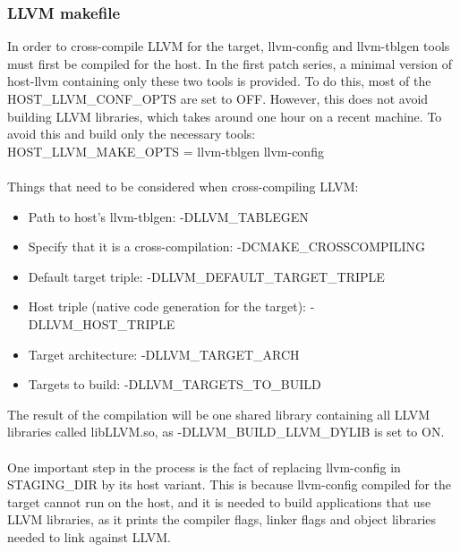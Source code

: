 \documentclass[12pt,a4paper,oneside]{article}
\begin{document}
\subsubsection*{LLVM makefile}
In order to cross-compile LLVM for the target, llvm-config and llvm-tblgen tools
must first be compiled for the host. In the first patch series, a minimal version of
host-llvm containing only these two tools is provided. To do this, most of the
{\selectfont HOST\_LLVM\_CONF\_OPTS} are set to OFF. However,
this does not avoid building LLVM libraries, which takes around one hour on a
recent machine. To avoid this and build only the necessary tools:\\
{\selectfont HOST\_LLVM\_MAKE\_OPTS = llvm-tblgen llvm-config}\\\\
Things that need to be considered when cross-compiling LLVM:
\begin{itemize}
  \item Path to host's llvm-tblgen: {\selectfont
  -DLLVM\_TABLEGEN}
  \item Specify that it is a cross-compilation: {\selectfont
  -DCMAKE\_CROSSCOMPILING}
  \item Default target triple: {\selectfont
  -DLLVM\_DEFAULT\_TARGET\_TRIPLE}
  \item Host triple (native code generation for the target): {\selectfont
  -DLLVM\_HOST\_TRIPLE}
  \item Target architecture: {\selectfont
  -DLLVM\_TARGET\_ARCH}
  \item Targets to build: {\selectfont
  -DLLVM\_TARGETS\_TO\_BUILD}
\end{itemize}
The result of the compilation will be one shared library containing all LLVM
libraries called libLLVM.so, as {\selectfont
-DLLVM\_BUILD\_LLVM\_DYLIB} is set to ON.\\\\
One important step in the process is the fact of replacing llvm-config in STAGING\_DIR
by its host variant. This is because llvm-config compiled for the target cannot
run on the host, and it is needed to build applications that use LLVM libraries,
as it prints the compiler flags, linker flags and object libraries needed to link
against LLVM.
\end{document}
